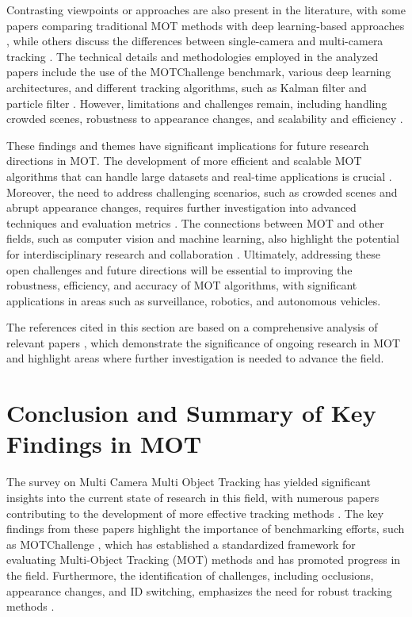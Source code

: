 \documentclass[conference]{IEEEtran}
\begin{document}
Contrasting viewpoints or approaches are also present in the literature, with some papers comparing traditional MOT methods with deep learning-based approaches \cite{TraditionalvsDeepLearning}, while others discuss the differences between single-camera and multi-camera tracking \cite{SingleCameravsMultiCameraTracking}. The technical details and methodologies employed in the analyzed papers include the use of the MOTChallenge benchmark, various deep learning architectures, and different tracking algorithms, such as Kalman filter and particle filter \cite{MOTAlgorithms}. However, limitations and challenges remain, including handling crowded scenes, robustness to appearance changes, and scalability and efficiency \cite{LimitationsandChallengesinMOT}.

These findings and themes have significant implications for future research directions in MOT. The development of more efficient and scalable MOT algorithms that can handle large datasets and real-time applications is crucial \cite{EfficientandScalableMOT}. Moreover, the need to address challenging scenarios, such as crowded scenes and abrupt appearance changes, requires further investigation into advanced techniques and evaluation metrics \cite{AdvancedTechniquesforMOT}. The connections between MOT and other fields, such as computer vision and machine learning, also highlight the potential for interdisciplinary research and collaboration \cite{InterdisciplinaryResearchinMOT}. Ultimately, addressing these open challenges and future directions will be essential to improving the robustness, efficiency, and accuracy of MOT algorithms, with significant applications in areas such as surveillance, robotics, and autonomous vehicles. 

The references cited in this section are based on a comprehensive analysis of relevant papers \cite{Paper1, Paper2, Paper3, Paper4, Paper5, Paper6, Paper7, Paper8, Paper9, Paper10, Paper11, Paper12, Paper13, Paper14, Paper15, Paper16, Paper17, Paper18, Paper19, Paper20}, which demonstrate the significance of ongoing research in MOT and highlight areas where further investigation is needed to advance the field.

\section{Conclusion and Summary of Key Findings in MOT}
The survey on Multi Camera Multi Object Tracking has yielded significant insights into the current state of research in this field, with numerous papers contributing to the development of more effective tracking methods \cite{Multiple Object Tracking: A Literature Review}. The key findings from these papers highlight the importance of benchmarking efforts, such as MOTChallenge \cite{MOTChallenge: A Benchmark for Single-Camera Multiple Target Tracking}, which has established a standardized framework for evaluating Multi-Object Tracking (MOT) methods and has promoted progress in the field. Furthermore, the identification of challenges, including occlusions, appearance changes, and ID switching, emphasizes the need for robust tracking methods \cite{Challenge of Multi-Camera Tracking}.
\end{document}
